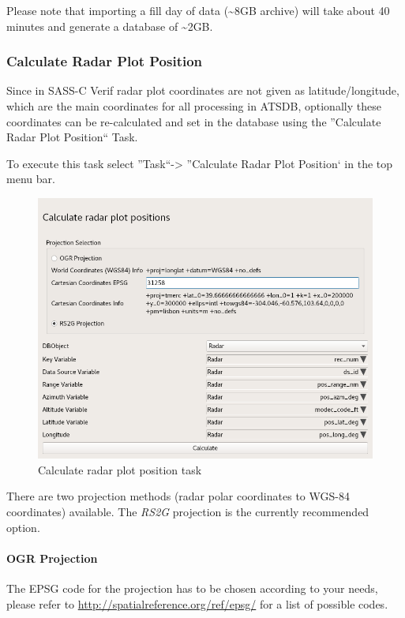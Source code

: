 Please note that importing a fill day of data (\textasciitilde8GB archive) will take about 40 minutes and generate a database of \textasciitilde2GB.


\subsubsection{Calculate Radar Plot Position}

Since in SASS-C Verif radar plot coordinates are not given as latitude/longitude, which are the main coordinates for all processing in ATSDB, optionally these coordinates can be re-calculated and set in the database using the ''Calculate Radar Plot Position`` Task.

To execute this task select ''Task``->  ''Calculate Radar Plot Position` in the top menu bar.

\begin{figure}[H]
  \center
    \includegraphics[width=14cm,frame]{../screenshots/task_calc_radar.png}
  \caption{Calculate radar plot position task}
  \label{fig:task_calc_radar}
\end{figure}

There are two projection methods (radar polar coordinates to WGS-84 coordinates) available. The \textit{RS2G} projection is the currently recommended option.

\paragraph{OGR Projection}

The EPSG code for the projection has to be chosen according to your needs, please refer to \url{http://spatialreference.org/ref/epsg/} for a list of possible codes.

